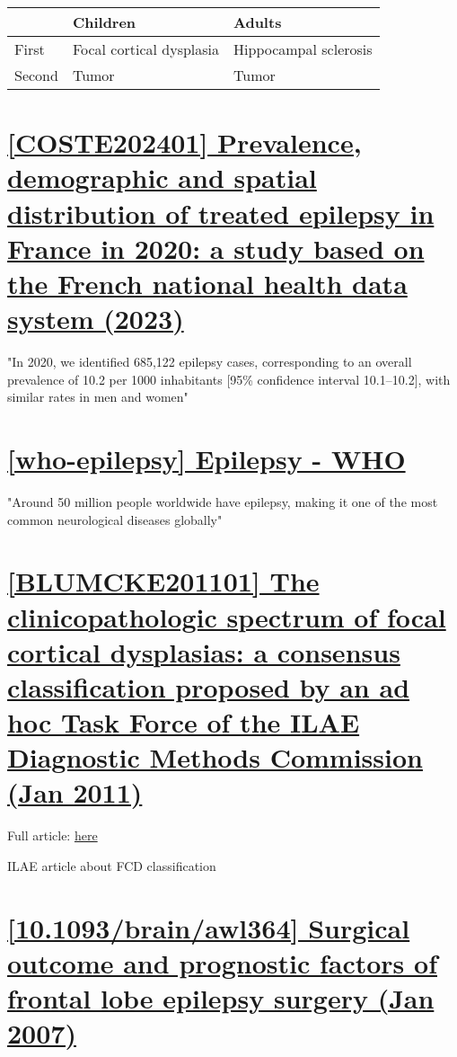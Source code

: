 \begin{tabular}{l|ll}
	& Children & Adults \\
	\hline
	First & Focal cortical dysplasia & Hippocampal sclerosis \\
	Second & Tumor & Tumor \\
\end{tabular}


\section{\href{https://link.springer.com/article/10.1007/s00415-023-11953-2?utm_source=getftr&utm_medium=getftr&utm_campaign=getftr_pilot&getft_integrator=sciencedirect_contenthosting}{[COSTE202401] Prevalence, demographic and spatial distribution of treated epilepsy in France in 2020: a study based on the French national health data system (2023) }}

"In 2020, we identified 685,122 epilepsy cases, corresponding to an overall prevalence of 10.2 per 1000 inhabitants [95\% confidence interval 10.1–10.2], with similar rates in men and women"

\section{\href{https://www.who.int/news-room/fact-sheets/detail/epilepsy/}{[who-epilepsy] Epilepsy - WHO}}

"Around 50 million people worldwide have epilepsy, making it one of the most common neurological diseases globally"

\section{\href{https://pubmed.ncbi.nlm.nih.gov/21219302/}{[BLUMCKE201101] The clinicopathologic spectrum of focal cortical dysplasias: a consensus classification proposed by an ad hoc Task Force of the ILAE Diagnostic Methods Commission (Jan 2011)}}

Full article: \href{https://www.ilae.org/files/dmfile/The-clinicopathologic-spectrum-of-FCD-Blumcke-2011.pdf}{here}

ILAE article about FCD classification

\section{\href{https://academic.oup.com/brain/article/130/2/574/287391}{[10.1093/brain/awl364] Surgical outcome and prognostic factors of frontal lobe epilepsy surgery (Jan 2007)}}

